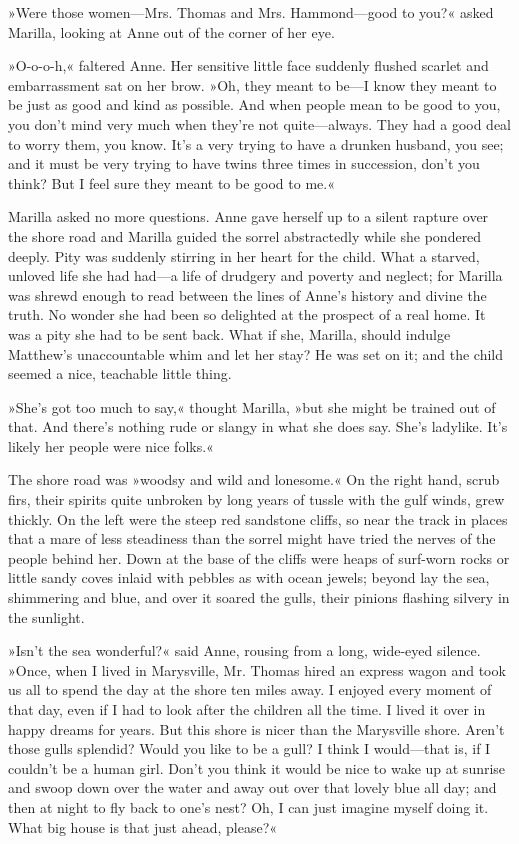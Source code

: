 »Were those women—Mrs. Thomas and Mrs. Hammond—good to you?« asked Marilla, looking at Anne out of the corner of her eye.

»O-o-o-h,« faltered Anne. Her sensitive little face suddenly flushed scarlet and embarrassment sat on her brow. »Oh, they meant to be—I know they meant to be just as good and kind as possible. And when people mean to be good to you, you don’t mind very much when they’re not quite—always. They had a good deal to worry them, you know. It’s a very trying to have a drunken husband, you see; and it must be very trying to have twins three times in succession, don’t you think? But I feel sure they meant to be good to me.«

Marilla asked no more questions. Anne gave herself up to a silent rapture over the shore road and Marilla guided the sorrel abstractedly while she pondered deeply. Pity was suddenly stirring in her heart for the child. What a starved, unloved life she had had—a life of drudgery and poverty and neglect; for Marilla was shrewd enough to read between the lines of Anne’s history and divine the truth. No wonder she had been so delighted at the prospect of a real home. It was a pity she had to be sent back. What if she, Marilla, should indulge Matthew’s unaccountable whim and let her stay? He was set on it; and the child seemed a nice, teachable little thing.

»She’s got too much to say,« thought Marilla, »but she might be trained out of that. And there’s nothing rude or slangy in what she does say. She’s ladylike. It’s likely her people were nice folks.«

The shore road was »woodsy and wild and lonesome.« On the right hand, scrub firs, their spirits quite unbroken by long years of tussle with the gulf winds, grew thickly. On the left were the steep red sandstone cliffs, so near the track in places that a mare of less steadiness than the sorrel might have tried the nerves of the people behind her. Down at the base of the cliffs were heaps of surf-worn rocks or little sandy coves inlaid with pebbles as with ocean jewels; beyond lay the sea, shimmering and blue, and over it soared the gulls, their pinions flashing silvery in the sunlight.

»Isn’t the sea wonderful?« said Anne, rousing from a long, wide-eyed silence. »Once, when I lived in Marysville, Mr. Thomas hired an express wagon and took us all to spend the day at the shore ten miles away. I enjoyed every moment of that day, even if I had to look after the children all the time. I lived it over in happy dreams for years. But this shore is nicer than the Marysville shore. Aren’t those gulls splendid? Would you like to be a gull? I think I would—that is, if I couldn’t be a human girl. Don’t you think it would be nice to wake up at sunrise and swoop down over the water and away out over that lovely blue all day; and then at night to fly back to one’s nest? Oh, I can just imagine myself doing it. What big house is that just ahead, please?«

